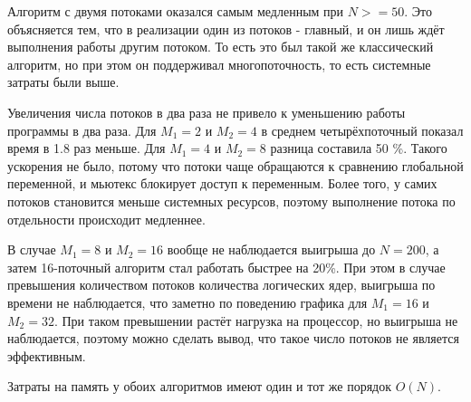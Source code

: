 Алгоритм с двумя потоками оказался самым медленным при $N >=50$. Это объясняется тем, что в реализации
один из потоков - главный, и он лишь ждёт выполнения работы другим потоком. То есть это был такой же 
классический алгоритм, но при этом он поддерживал многопоточность, то есть системные затраты были выше.

Увеличения числа потоков в два раза не привело к уменьшению работы программы в два раза. Для
$M_1 = 2$ и $M_2 = 4$ в среднем четырёхпоточный показал время в 1.8 раз меньше. Для 
$M_1 = 4$ и $M_2 = 8$ разница составила 50 \%. Такого ускорения не было, потому что потоки чаще 
обращаются к сравнению глобальной переменной, и мьютекс блокирует доступ к переменным. Более того,
у самих потоков становится меньше системных ресурсов, поэтому выполнение потока по отдельности
происходит медленнее.

В случае $M_1 = 8$ и $M_2 = 16$ вообще не наблюдается выигрыша до $N=200$, а затем 16-поточный алгоритм стал 
работать быстрее на 20\%. При этом в случае превышения количеством потоков количества логических ядер,
выигрыша по времени не наблюдается, что заметно по поведению графика для $M_1 = 16$ и $M_2 = 32$.
При таком превышении растёт нагрузка на процессор, но выигрыша не наблюдается, поэтому можно сделать вывод,
что такое число потоков не является эффективным.

Затраты на память у обоих алгоритмов имеют один и тот же порядок $O(N)$.